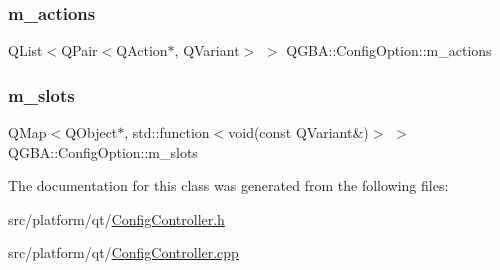 \subsubsection{\texorpdfstring{m\+\_\+actions}{m\_actions}}
{\footnotesize\ttfamily Q\+List$<$Q\+Pair$<$Q\+Action$\ast$, Q\+Variant$>$ $>$ Q\+G\+B\+A\+::\+Config\+Option\+::m\+\_\+actions\hspace{0.3cm}{\ttfamily [private]}}

\mbox{\label{class_q_g_b_a_1_1_config_option_a0950b5531e60fdf40af0211de0e46aca}} 
\subsubsection{\texorpdfstring{m\+\_\+slots}{m\_slots}}
{\footnotesize\ttfamily Q\+Map$<$Q\+Object$\ast$, std\+::function$<$void(const Q\+Variant\&)$>$ $>$ Q\+G\+B\+A\+::\+Config\+Option\+::m\+\_\+slots\hspace{0.3cm}{\ttfamily [private]}}



The documentation for this class was generated from the following files\+:\begin{DoxyCompactItemize}
\item 
src/platform/qt/\mbox{\hyperlink{_config_controller_8h}{Config\+Controller.\+h}}\item 
src/platform/qt/\mbox{\hyperlink{_config_controller_8cpp}{Config\+Controller.\+cpp}}\end{DoxyCompactItemize}
